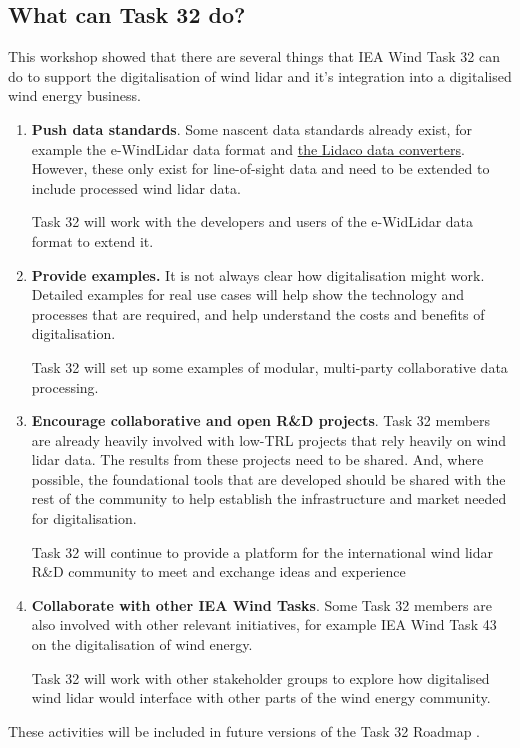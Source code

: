 \subsection{What can Task 32 do?}

This workshop showed that there are several things that IEA Wind Task 32 can do to support the digitalisation of wind lidar and it's integration into a digitalised wind energy business.

\begin{enumerate}
\item
  \textbf{Push data standards}. Some nascent data standards already exist,
  for example the e-WindLidar data format \cite{nikola_vasiljevic_2018_2478051} and \href{https://github.com/e-WindLidar/Lidaco}{the Lidaco data converters}. However, these only exist for line-of-sight data   and need to be extended to include processed wind lidar data. 
  \begin{taskactions}
    Task 32 will work with the developers and users of the e-WidLidar data format to extend it.
  \end{taskactions}
\item
  \textbf{Provide examples.} It is not always clear how digitalisation might work. Detailed examples for real use cases will help show the technology and processes that are required, and help understand the costs and benefits of digitalisation.
  \begin{taskactions}
    Task 32 will set up some examples of modular, multi-party collaborative data processing.
  \end{taskactions}
\item  
  \textbf{Encourage collaborative and open R\&D projects}. Task 32 members are
  already heavily involved with low-TRL projects that rely heavily on
  wind lidar data. The results from these projects need to be shared.
  And, where possible, the foundational tools that are developed should
  be shared with the rest of the community to help establish the
  infrastructure and market needed for digitalisation.
  \begin{taskactions}
    Task 32 will continue to provide a platform for the international wind lidar R\&D community to meet and exchange ideas and experience
  \end{taskactions}
\item
  \textbf{Collaborate with other IEA Wind Tasks}. Some Task 32 members
  are also involved with other relevant initiatives, for example IEA
  Wind Task 43 on the digitalisation of wind energy. 
  \begin{taskactions} 
  Task 32 will work with other stakeholder groups to explore how digitalised wind lidar would interface with
  other parts of the wind energy community.
  \end{taskactions}
\end{enumerate}

These activities will be included in future versions of the Task 32 Roadmap \cite{clifton_2020_roadmap}.

